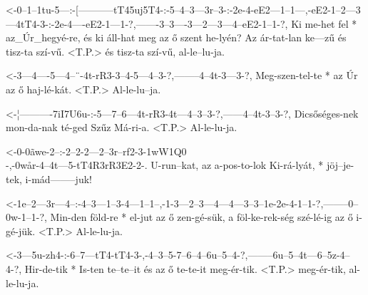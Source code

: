 

  {<-0--1--1tu-5---:-[-----------tT45uj5T4-:-5--4--3---3r--3-:-2e-4-eE2---1--1---,-eE2-1--2---3---4tT4-3-:-2e-4----eE2-1---1-?,-------3--3----3---2---3---4--eE2-1--1-?,}
  {  Ki me-het fel * az_Úr_hegyé-re,         és ki áll-hat meg az ő szent he-lyén? Az  ár-tat-lan ke---zű  és tisz-ta  szí-vű. <T.P.> és tisz-ta  szí-vű, al-le--lu-ja.}

  {<-3---4----5---4--¨-4t-rR3-3--4-5---4--3-?,--------4--4t-3---3-?,}
  {  Meg-szen-tel-te * az Úr  az ő haj-lé-kát. <T.P.> Al-le-lu--ja.}

  {<-¦----------7iI7U6u-:-5---7--6---4t-rR3-4t---4--3--3-?,------4--4t-3--3-?,}
  {  Dicsőséges-nek       mon-da-nak té-ged Szűz Má-ri-a. <T.P.> Al-le-lu-ja.}



  {<-0-0ãwe-2--:-2--2-2---2--3r--rf2-3-1wW1Q0\\-,-0wår-4--4t---5-tT4R3rR3E2-2-.}
  {  U-run--kat, az a-pos-to-lok Ki-rá-lyát,    * jöj--je-tek, i-mád--------juk!}


  {<-1e--2---3r---4--:-4--3---1--3-4---1--1--,-1-3---2--3---4---4---3--3--1e-2e-4-1--1-?,--------0--0w-1--1-?,}
  {  Min-den föld-re * el-jut az ő zen-gé-sük, a föl-ke-rek-ség szé-lé-ig az ő  i-gé-jük. <T.P.> Al-le-lu-ja.}

  {<-3---5u-zh4-:-6--7---tT4-tT4-3-,-4--3--5-7--6--4--6u--5--4-?,--------6u--5--4t---6--5z-4--4-?,}
  {  Hir-de-tik * Is-ten te--te--it  és az ő te-te-it meg-ér-tik. <T.P.> meg-ér-tik, al-le-lu-ja.}

